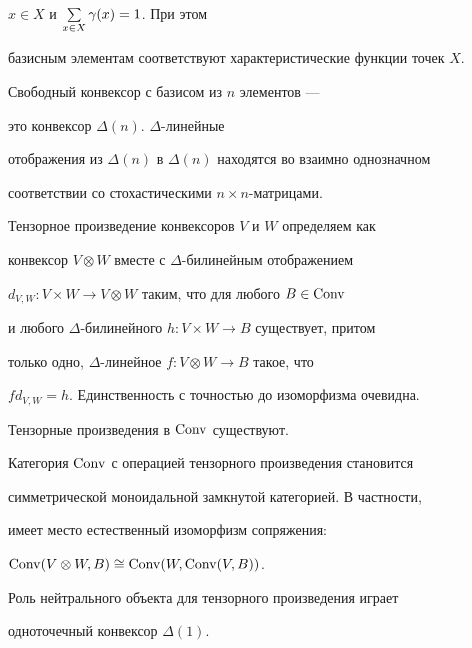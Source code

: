 $x\in X$ и $\sum\limits_{x\in X} \gamma(x)=1$. При этом


базисным элементам соответствуют характеристические функции точек $X$.


Свободный конвексор с базисом из $n$ элементов --- 


это конвексор $\Delta(n)$.\; $\Delta$-линейные


отображения из $\Delta(n)$ в $\Delta(n)$ находятся во взаимно однозначном


соответствии со стохастическими $n\times n$-матрицами.





Тензорное произведение конвексоров $V$ и $W$ определяем как


конвексор $V\otimes W$ вместе с $\Delta$-билинейным отображением


$d_{V,W}:V\times W\to V\otimes W$ таким, что для любого $B\in \operatorname{Conv}$


и любого $\Delta$-билинейного $h: V\times W\to B$ существует, притом


только одно, $\Delta$-линейное $f: V\otimes W\to B$ такое, что


$f d_{V,W}=h$. Единственность с точностью до изоморфизма очевидна.





\begin{thm}


Тензорные произведения в $\operatorname{Conv}$ существуют.


Категория $\operatorname{Conv}$ с операцией тензорного произведения становится


симметрической моноидальной замкнутой категорией. В частности,


имеет место естественный изоморфизм сопряжения:


$\operatorname{Conv}(V\otimes W, B)\cong \operatorname{Conv}(W, \operatorname{Conv}(V, B))$.


Роль нейтрального объекта для тензорного произведения играет


одноточечный конвексор $\Delta(1)$.


\end{thm}





